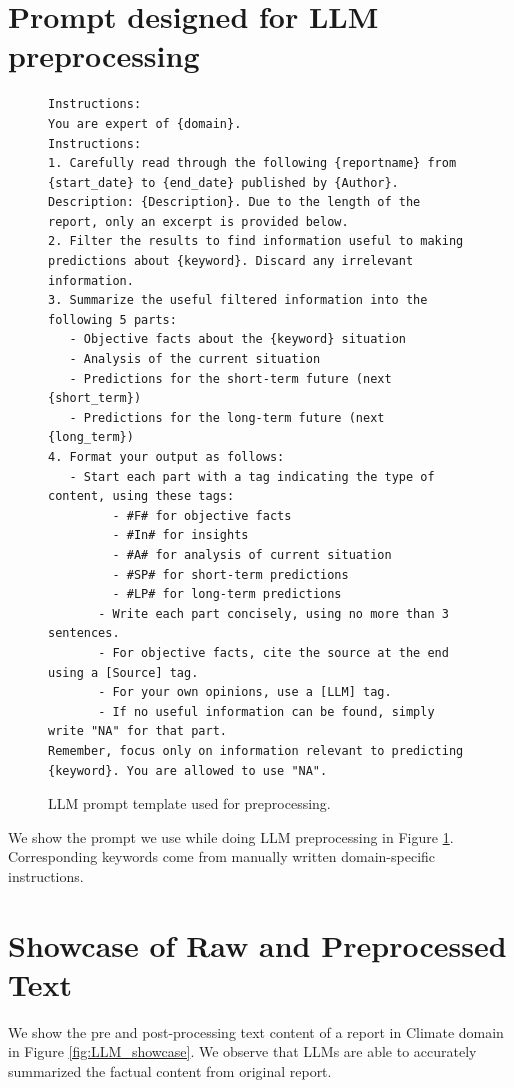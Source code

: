 \section{Prompt designed for LLM preprocessing}\label{app:prompt}
\lstset{
basicstyle=\small\ttfamily,
columns=flexible,
breaklines=true
}
\begin{figure}[h]
    \centering
    \begin{tcolorbox}
    \begin{lstlisting}
Instructions:
You are expert of {domain}.
Instructions:
1. Carefully read through the following {reportname} from {start_date} to {end_date} published by {Author}. Description: {Description}. Due to the length of the report, only an excerpt is provided below.
2. Filter the results to find information useful to making predictions about {keyword}. Discard any irrelevant information.
3. Summarize the useful filtered information into the following 5 parts:
   - Objective facts about the {keyword} situation
   - Analysis of the current situation
   - Predictions for the short-term future (next {short_term})
   - Predictions for the long-term future (next {long_term})
4. Format your output as follows:
   - Start each part with a tag indicating the type of content, using these tags:
         - #F# for objective facts
         - #In# for insights
         - #A# for analysis of current situation
         - #SP# for short-term predictions
         - #LP# for long-term predictions
       - Write each part concisely, using no more than 3 sentences.
       - For objective facts, cite the source at the end using a [Source] tag.
       - For your own opinions, use a [LLM] tag.
       - If no useful information can be found, simply write "NA" for that part.
Remember, focus only on information relevant to predicting {keyword}. You are allowed to use "NA".
    \end{lstlisting}
    \end{tcolorbox}
    \caption{LLM prompt template used for preprocessing.}
    \label{fig:prompt}
\end{figure}

We show the prompt we use while doing LLM preprocessing in Figure \ref{fig:prompt}. Corresponding keywords come from manually written domain-specific instructions.
\newpage
\section{Showcase of Raw and Preprocessed Text}\label{app:showcase}

We show the pre and post-processing text content of a report in Climate domain in Figure \ref{fig:LLM_showcase}. We observe that LLMs are able to accurately summarized the factual content from original report.


